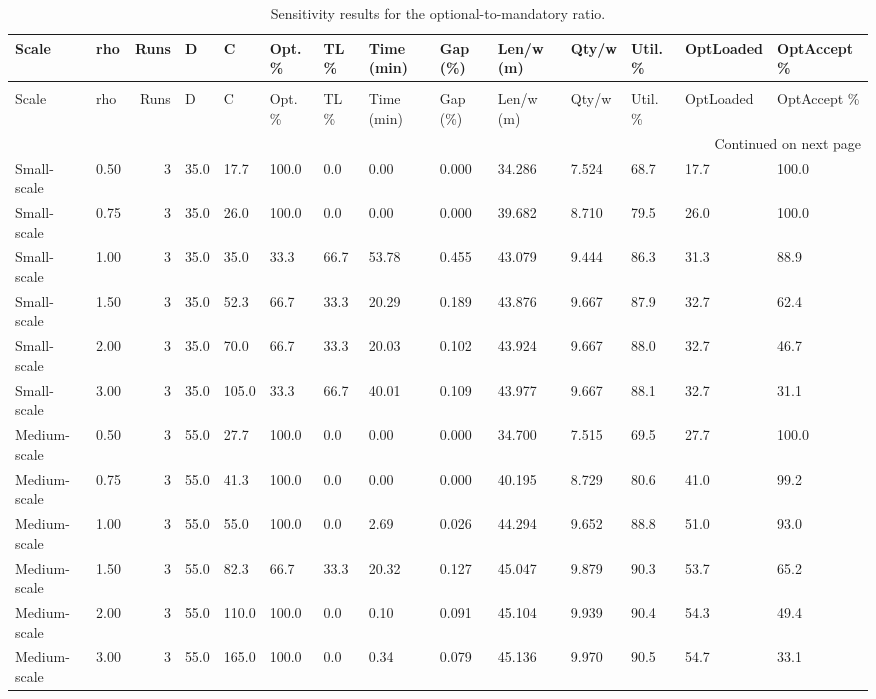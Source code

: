 \begin{longtable}{llrlllllllllll}
\caption{Sensitivity results for the optional-to-mandatory ratio.} \label{tab:app_optional_ratio} \\
\toprule
Scale & rho & Runs & D & C & Opt. \% & TL \% & Time (min) & Gap (\%) & Len/w (m) & Qty/w & Util. \% & OptLoaded & OptAccept \% \\
\midrule
\endfirsthead
\caption[]{Sensitivity results for the optional-to-mandatory ratio.} \\
\toprule
Scale & rho & Runs & D & C & Opt. \% & TL \% & Time (min) & Gap (\%) & Len/w (m) & Qty/w & Util. \% & OptLoaded & OptAccept \% \\
\midrule
\endhead
\midrule
\multicolumn{14}{r}{Continued on next page} \\
\midrule
\endfoot
\bottomrule
\endlastfoot
Small-scale & 0.50 & 3 & 35.0 & 17.7 & 100.0 & 0.0 & 0.00 & 0.000 & 34.286 & 7.524 & 68.7 & 17.7 & 100.0 \\
Small-scale & 0.75 & 3 & 35.0 & 26.0 & 100.0 & 0.0 & 0.00 & 0.000 & 39.682 & 8.710 & 79.5 & 26.0 & 100.0 \\
Small-scale & 1.00 & 3 & 35.0 & 35.0 & 33.3 & 66.7 & 53.78 & 0.455 & 43.079 & 9.444 & 86.3 & 31.3 & 88.9 \\
Small-scale & 1.50 & 3 & 35.0 & 52.3 & 66.7 & 33.3 & 20.29 & 0.189 & 43.876 & 9.667 & 87.9 & 32.7 & 62.4 \\
Small-scale & 2.00 & 3 & 35.0 & 70.0 & 66.7 & 33.3 & 20.03 & 0.102 & 43.924 & 9.667 & 88.0 & 32.7 & 46.7 \\
Small-scale & 3.00 & 3 & 35.0 & 105.0 & 33.3 & 66.7 & 40.01 & 0.109 & 43.977 & 9.667 & 88.1 & 32.7 & 31.1 \\
Medium-scale & 0.50 & 3 & 55.0 & 27.7 & 100.0 & 0.0 & 0.00 & 0.000 & 34.700 & 7.515 & 69.5 & 27.7 & 100.0 \\
Medium-scale & 0.75 & 3 & 55.0 & 41.3 & 100.0 & 0.0 & 0.00 & 0.000 & 40.195 & 8.729 & 80.6 & 41.0 & 99.2 \\
Medium-scale & 1.00 & 3 & 55.0 & 55.0 & 100.0 & 0.0 & 2.69 & 0.026 & 44.294 & 9.652 & 88.8 & 51.0 & 93.0 \\
Medium-scale & 1.50 & 3 & 55.0 & 82.3 & 66.7 & 33.3 & 20.32 & 0.127 & 45.047 & 9.879 & 90.3 & 53.7 & 65.2 \\
Medium-scale & 2.00 & 3 & 55.0 & 110.0 & 100.0 & 0.0 & 0.10 & 0.091 & 45.104 & 9.939 & 90.4 & 54.3 & 49.4 \\
Medium-scale & 3.00 & 3 & 55.0 & 165.0 & 100.0 & 0.0 & 0.34 & 0.079 & 45.136 & 9.970 & 90.5 & 54.7 & 33.1 \\

\end{longtable}
